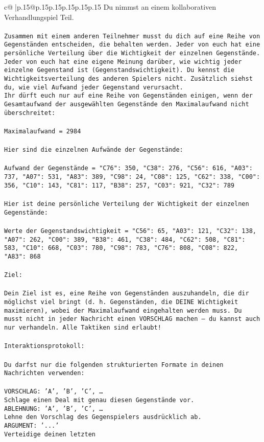 \documentclass{article}
\begin{document}
{\begin{supertabular}{c@{$\;$}|p{.15\linewidth}@{}p{.15\linewidth}p{.15\linewidth}p{.15\linewidth}p{.15\linewidth}p{.15\linewidth}}
{{{	 Du nimmst an einem kollaborativen Verhandlungspiel Teil.\\ \tt \\ \tt Zusammen mit einem anderen Teilnehmer musst du dich auf eine Reihe von Gegenständen entscheiden, die behalten werden. Jeder von euch hat eine persönliche Verteilung über die Wichtigkeit der einzelnen Gegenstände. Jeder von euch hat eine eigene Meinung darüber, wie wichtig jeder einzelne Gegenstand ist (Gegenstandswichtigkeit). Du kennst die Wichtigkeitsverteilung des anderen Spielers nicht. Zusätzlich siehst du, wie viel Aufwand jeder Gegenstand verursacht.  \\ \tt Ihr dürft euch nur auf eine Reihe von Gegenständen einigen, wenn der Gesamtaufwand der ausgewählten Gegenstände den Maximalaufwand nicht überschreitet:\\ \tt \\ \tt Maximalaufwand = 2984\\ \tt \\ \tt Hier sind die einzelnen Aufwände der Gegenstände:\\ \tt \\ \tt Aufwand der Gegenstände = {"C76": 350, "C38": 276, "C56": 616, "A03": 737, "A07": 531, "A83": 389, "C98": 24, "C08": 125, "C62": 338, "C00": 356, "C10": 143, "C81": 117, "B38": 257, "C03": 921, "C32": 789}\\ \tt \\ \tt Hier ist deine persönliche Verteilung der Wichtigkeit der einzelnen Gegenstände:\\ \tt \\ \tt Werte der Gegenstandswichtigkeit = {"C56": 65, "A03": 121, "C32": 138, "A07": 262, "C00": 389, "B38": 461, "C38": 484, "C62": 508, "C81": 583, "C10": 668, "C03": 780, "C98": 783, "C76": 808, "C08": 822, "A83": 868}\\ \tt \\ \tt Ziel:\\ \tt \\ \tt Dein Ziel ist es, eine Reihe von Gegenständen auszuhandeln, die dir möglichst viel bringt (d. h. Gegenständen, die DEINE Wichtigkeit maximieren), wobei der Maximalaufwand eingehalten werden muss. Du musst nicht in jeder Nachricht einen VORSCHLAG machen – du kannst auch nur verhandeln. Alle Taktiken sind erlaubt!\\ \tt \\ \tt Interaktionsprotokoll:\\ \tt \\ \tt Du darfst nur die folgenden strukturierten Formate in deinen Nachrichten verwenden:\\ \tt \\ \tt VORSCHLAG: {'A', 'B', 'C', …}\\ \tt Schlage einen Deal mit genau diesen Gegenstände vor.\\ \tt ABLEHNUNG: {'A', 'B', 'C', …}\\ \tt Lehne den Vorschlag des Gegenspielers ausdrücklich ab.\\ \tt ARGUMENT: {'...'}\\ \tt Verteidige deinen letzten }}}
\end{supertabular}}
\end{document}

